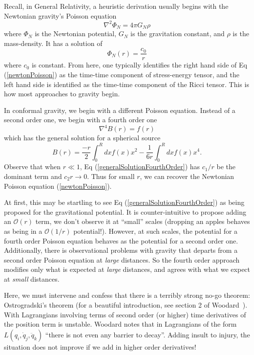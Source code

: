 

Recall, in General Relativity, a heuristic derivation usually begins
with the Newtonian gravity's Poisson equation
\begin{equation}\label{newtonPoisson}
\nabla^{2}\Phi_{N} = 4\pi G_{N}\rho
\end{equation}
where $\Phi_{N}$ is the Newtonian potential, $G_{N}$ is the
gravitation constant, and $\rho$ is the mass-density. It has a
solution of
\begin{equation}\label{generalSolutionSecondOrder}
\Phi_{N}(r) = \frac{c_{0}}{r}
\end{equation}
where $c_{0}$ is constant.
From here, one typically identifies the right hand side of Eq
(\ref{newtonPoisson}) as the time-time component of stress-energy
tensor, and the left hand side is identified as the time-time
component of the Ricci tensor. This is how most approaches to gravity begin.

In conformal gravity, we begin with a different Poisson
equation. Instead of a second order one, we begin with a fourth order
one~\cite{Mannheim:1994ph}
\begin{equation}\label{fourthOrderPoisson}
\nabla^{4}B(r) = f(r)
\end{equation}
which has the general solution for a spherical source
\begin{equation}\label{generalSolutionFourthOrder}
B(r) = \frac{-r}{2}\int^{R}_{0}dxf(x)x^{2} - \frac{1}{6r}\int^{R}_{0}dxf(x)x^{4}.
\end{equation}
Observe that when $r\ll 1$, Eq (\ref{generalSolutionFourthOrder}) has
$c_{1}/r$ be the dominant term and $c_{2}r\to 0$. Thus for small $r$,
we can recover the Newtonian Poisson equation (\ref{newtonPoisson}).

At first, this may be startling to see Eq
(\ref{generalSolutionFourthOrder}) as being proposed for the
gravitational potential. It is counter-intuitive to propose adding an
$\mathcal{O}(r)$ term, we don't observe it at ``small'' scales
(dropping an apples behaves as being in a $\mathcal{O}(1/r)$
potential!). However, at such scales, the potential for
a fourth order Poisson equation behaves as the potential for a second
order one. Additionally, there is observational problems with gravity
that departs from a second order Poisson equation at \emph{large}
distances. So the fourth order approach modifies only what is expected
at \emph{large} distances, and agrees with what we expect at
\emph{small} distances.

Here, we must intervene and confess that there is a terribly strong
no-go theorem: Ostrogradski's theorem (for a beautiful introduction,
see section 2 of Woodard~\cite{Woodard:2006nt}). With
Lagrangians involving terms of second order (or higher) time
derivatives of the position term is unstable. Woodard notes that in
Lagrangians of the form $L(q_{i},\dot{q}_{j},\ddot{q}_{k})$ ``there is
not even any barrier to decay''. Adding insult to injury, the
situation does not improve if we add in higher order derivatives!
